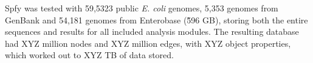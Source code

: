 Spfy was tested with 59,5323 public \textit{E. coli} genomes, 5,353 genomes from GenBank and 54,181 genomes from Enterobase (\~596 GB), storing both the entire sequences and results for all included analysis modules.
The resulting database had XYZ million nodes and XYZ million edges, with XYZ object properties, which worked out to XYZ TB of data stored.

